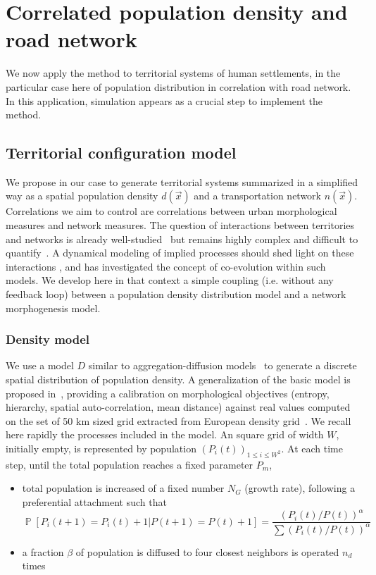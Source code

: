 \documentclass{bmcart}
\DeclareMathOperator{\Proba}{\mathbb{P}}
\newcommand{\Pb}[1]{\ensuremath{\Proba\!\left[#1\right]}}
\begin{document}
\section*{Correlated population density and road network}

We now apply the method to territorial systems of human settlements, in the particular case here of population distribution in correlation with road network. In this application, simulation appears as a crucial step to implement the method.


\subsection*{Territorial configuration model}

We propose in our case to generate territorial systems summarized in a simplified way as a spatial population density $d(\vec{x})$ and a transportation network $n(\vec{x})$. Correlations we aim to control are correlations between urban morphological measures and network measures. The question of interactions between territories and networks is already well-studied~\cite{offner1996reseaux} but remains highly complex and difficult to quantify~\cite{offner1993effets}. A dynamical modeling of implied processes should shed light on these interactions \cite{bretagnolle:tel-00459720}, and \cite{raimbault2018caracterisation} has investigated the concept of co-evolution within such models. We develop here in that context a simple coupling (i.e. without any feedback loop) between a population density distribution model and a network morphogenesis model.



\subsubsection*{Density model}

We use a model $D$ similar to aggregation-diffusion models~\cite{batty2006hierarchy} to generate a discrete spatial distribution of population density. A generalization of the basic model is proposed in~\cite{raimbault2018calibration}, providing a calibration on morphological objectives (entropy, hierarchy, spatial auto-correlation, mean distance) against real values computed on the set of 50 km sized grid extracted from European density grid~\cite{eurostat}. We recall here rapidly the processes included in the model. An square grid of width $W$, initially empty, is represented by population $(P_i(t))_{1\leq i\leq W^2}$. At each time step, until the total population reaches a fixed parameter $P_m$,
\begin{itemize}
\item total population is increased of a fixed number $N_G$ (growth rate), following a preferential attachment such that 
\begin{equation} 
\Pb{P_i(t+1)=P_i(t)+1|P(t+1)=P(t)+1}=\frac{(P_i(t)/P(t))^{\alpha}}{\sum(P_i(t)/P(t))^{\alpha}}
\end{equation}
\item a fraction $\beta$ of population is diffused to four closest neighbors is operated $n_d$ times
\end{itemize}
\end{document}
